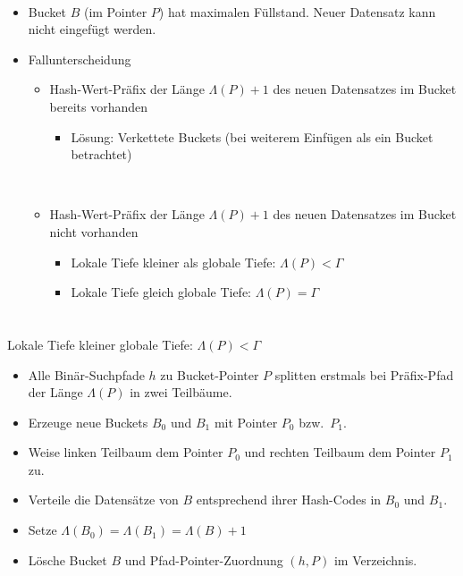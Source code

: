 \begin{frame}{\insertsection}
\framesubtitle{\insertsubsection}	
\begin{itemize}
	\item Bucket $B$ (im Pointer $P$) hat maximalen F\"ullstand. Neuer Datensatz kann nicht eingef\"ugt werden.
	\ \\[4pt]
	\item Fallunterscheidung
	\begin{itemize}
		\item Hash-Wert-Pr\"afix der L\"ange $\Lambda(P)+1$ des neuen Datensatzes im Bucket bereits vorhanden
		\begin{itemize}
			\item L\"osung: Verkettete Buckets (bei weiterem Einf\"ugen als ein Bucket betrachtet)
		\end{itemize} 
		\ \\[4pt]
		\item Hash-Wert-Pr\"afix der L\"ange $\Lambda(P)+1$ des neuen Datensatzes im Bucket nicht vorhanden
		\begin{itemize}
			\item Lokale Tiefe kleiner als globale Tiefe: $\Lambda(P)<\Gamma$
			\item Lokale Tiefe gleich globale Tiefe: $\Lambda(P)=\Gamma$
		\end{itemize}
	\end{itemize}
\end{itemize}
\end{frame}

\begin{frame}{\insertsection}
\framesubtitle{\insertsubsection}	
\\[4pt]
Lokale Tiefe kleiner globale Tiefe: $\Lambda(P)<\Gamma$
\begin{itemize}
\item Alle Bin\"ar-Suchpfade $h$ zu Bucket-Pointer $P$ splitten erstmals bei Pr\"afix-Pfad der L\"ange $\Lambda(P)$ 
in zwei Teilb\"aume.
\pause
\item Erzeuge neue Buckets $B_0$ und $B_1$ mit Pointer $P_0$ bzw.~$P_1$.
\pause
\item Weise linken Teilbaum dem Pointer $P_0$ und rechten Teilbaum dem Pointer $P_1$ zu.
\pause
\item Verteile die Datens\"atze von $B$ entsprechend ihrer Hash-Codes in $B_0$ und $B_1$.
\pause
\item Setze $\Lambda(B_0)=\Lambda(B_1)=\Lambda(B)+1$
\pause
\item L\"osche Bucket $B$ und Pfad-Pointer-Zuordnung $(h, P)$ im Verzeichnis.
\end{itemize}
\end{frame}

